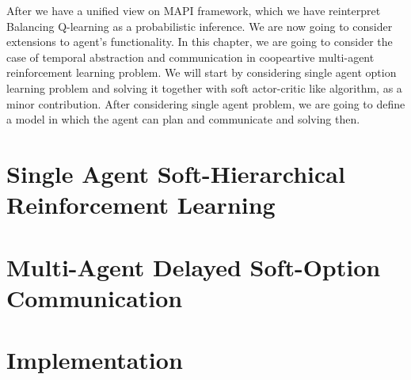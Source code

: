 \label{chapter:chap4}
\begin{miniabstract}
After we have a unified view on MAPI framework, which we have reinterpret Balancing Q-learning \cite{grau2018balancing} as a probabilistic inference. We are now going to consider extensions to agent's functionality. In this chapter, we are going to consider the case of temporal abstraction and communication in coopeartive multi-agent reinforcement learning problem. We will start by considering single agent option learning problem and solving it together with soft actor-critic like algorithm, as a minor contribution. After considering single agent problem, we are going to define a model in which the agent can plan and communicate and solving then.
\end{miniabstract}


\section{Single Agent Soft-Hierarchical Reinforcement Learning}


\section{Multi-Agent Delayed Soft-Option Communication}


\section{Implementation}


